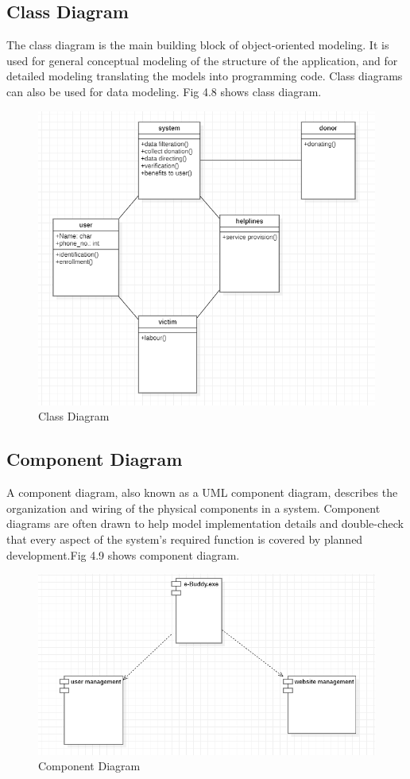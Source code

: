 \subsection{Class Diagram}
The class diagram is the main building block of object-oriented modeling. It is used for general conceptual modeling of the structure of the application, and for detailed modeling translating the models into programming code. Class diagrams can also be used for data modeling. Fig 4.8 shows class diagram.
\begin{figure}[H]
    \centering
    \includegraphics[scale=0.70]{design/ClassDiagram.png}
    \caption{Class Diagram}
    \label{fig:my_label}
\end{figure}

\subsection{Component Diagram}
A component diagram, also known as a UML component diagram, describes the organization and wiring of the physical components in a system. Component diagrams are often drawn to help model implementation details and double-check that every aspect of the system’s required function is covered by planned development.Fig 4.9 shows component diagram.
\begin{figure}[H]
    \centering
    \includegraphics[scale=0.60]{design/ComponentDiagram.png}
    \caption{Component Diagram}
    \label{fig:my_label}
\end{figure}

